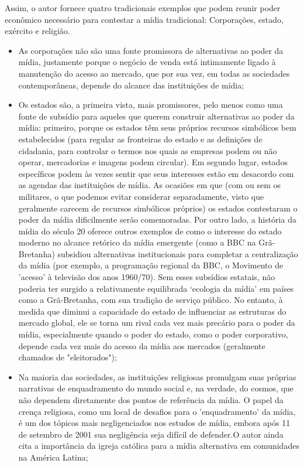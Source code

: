 Assim, o autor fornece quatro tradicionais exemplos que podem reunir  poder econômico necessário para contestar a mídia tradicional: Corporações, estado, exército e religião.
\begin{itemize}
    \item As corporações não são uma fonte promissora de alternativas ao poder da mídia, justamente porque o negócio de venda está intimamente ligado à manutenção do acesso ao mercado, que por sua vez, em todas as sociedades contemporâneas, depende do alcance das instituições de mídia;
    \item Os estados são, a primeira vista, mais promissores, pelo menos como uma fonte de subsídio para aqueles que querem construir alternativas ao poder da mídia: primeiro, porque os estados têm seus próprios recursos simbólicos bem estabelecidos (para regular as fronteiras do estado e as definições de cidadania, para controlar o termos nos quais as empresas podem ou não operar, mercadorias e imagens podem circular). Em segundo lugar, estados específicos podem às vezes sentir que seus interesses estão em desacordo com as agendas das instituições de mídia. As ocasiões em que (com ou sem os militares, o que podemos evitar considerar separadamente, visto que geralmente carecem de recursos simbólicos próprios) os estados contestaram o poder da mídia dificilmente serão comemoradas. Por outro lado, a história da mídia do século 20 oferece outros exemplos de como o interesse do estado moderno no alcance retórico da mídia emergente (como a BBC na Grã-Bretanha) subsidiou alternativas institucionais para completar a centralização da mídia (por exemplo, a programação regional da BBC, o Movimento de 'acesso' à televisão dos anos 1960/70). Sem esses subsídios estatais, não poderia ter surgido a relativamente equilibrada ‘ecologia da mídia’ em países como a Grã-Bretanha, com sua tradição de serviço público. No entanto, à medida que diminui a capacidade do estado de influenciar as estruturas do mercado global, ele se torna um rival cada vez mais precário para o poder da mídia, especialmente quando o poder do estado, como o poder corporativo, depende cada vez mais do acesso da mídia aos mercados (geralmente chamados de "eleitorados");
    \item Na maioria das sociedades, as instituições religiosas promulgam suas próprias narrativas de enquadramento do mundo social e, na verdade, do cosmos, que não dependem diretamente dos pontos de referência da mídia. O papel da crença religiosa, como um local de desafios para o 'enquadramento' da mídia, é um dos tópicos mais negligenciados nos estudos de mídia, embora após 11 de setembro de 2001 sua negligência seja difícil de defender.O autor ainda cita a importância da igreja católica para a mídia alternativa em comunidades na América Latina;
\end{itemize}


